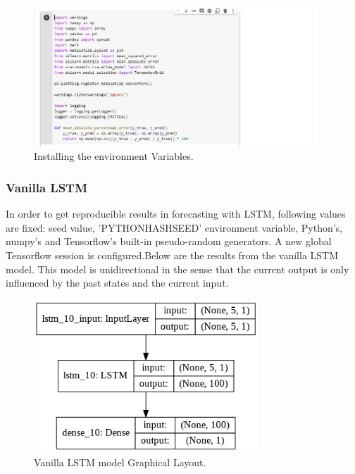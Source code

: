 \documentclass[12pt]{report}
\begin{document}
\begin{figure}[H]%
  \begin {center}
  \includegraphics[width=0.95\textwidth]{images/Dependencies.PNG}
  \caption{Installing the environment Variables.}
  \label{fig:ecg}
  \end {center}
\end{figure}


\subsubsection{Vanilla LSTM}

In order to get reproducible results in forecasting with LSTM, following values are fixed: seed value, 'PYTHONHASHSEED' environment variable, Python's, numpy's and Tensorflow's built-in pseudo-random generators. A new global Tensorflow session is configured.Below are the results from the vanilla LSTM model.
This model is unidirectional in the sense that the current output is only influenced by the past states and the current input.
\begin{figure}[H]%
  \begin {center}
  \includegraphics[width=0.75\textwidth]{dia.png}
  \caption{Vanilla LSTM model Graphical Layout.}
  \label{fig:ecg}
  \end {center}
\end{figure}
\end{document}
